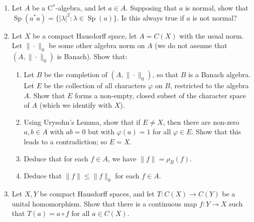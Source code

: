 \documentclass[twoside,12pt,a4paper]{article}
\newcommand{\Sp}{\operatorname{Sp}}
\begin{document}
\begin{enumerate}
\item Let $A$ be a C$^*$-algebra, and let $a\in A$.  Supposing that
$a$ is normal, show that $\Sp(a^*a) = \{ |\lambda|^2 : \lambda\in\Sp(a) \}$.
Is this always true if $a$ is not normal?
\item Let $X$ be a compact Hausdorff space, let $A=C(X)$ with the usual
norm.  Let $\|\cdot\|_0$ be some other algebra norm on $A$ (we do not assume
that $(A,\|\cdot\|_0)$ is Banach).  Show that:
\begin{enumerate}
\item Let $B$ be the completion of $(A,\|\cdot\|_0)$, so that $B$ is
a Banach algebra.  Let $E$ be the collection of all characters $\varphi$ on
$B$, restricted to the algebra $A$.  Show that $E$ forms a non-empty,
closed subset of the character space of $A$ (which we identify with $X$).
\item Using Urysohn's Lemma, show that if $E\not=X$, then there are non-zero
$a,b\in A$ with $ab=0$ but with $\varphi(a)=1$ for all $\varphi\in E$.
Show that this leads to a contradiction; so $E=X$.
\item Deduce that for each $f\in A$, we have $\|f\| = \rho_B(f)$.
\item Deduce that $\|f\| \leq \|f\|_0$ for each $f\in A$.
\end{enumerate}
\item Let $X,Y$ be compact Hausdorff spaces, and let $T:C(X)\rightarrow C(Y)$
be a unital homomorphism.  Show that there is a continuous map $f:Y\rightarrow
X$ such that $T(a) = a\circ f$ for all $a\in C(X)$.


\end{enumerate}
\end{document}
